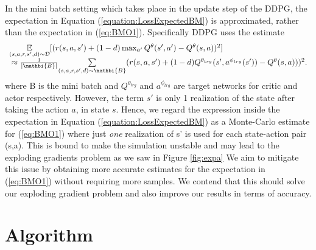 In the mini batch setting which takes place in the update step of the DDPG, the expectation in Equation (\ref{equation:LossExpectedBM}) is approximated, rather than the expectation in (\ref{eq:BMO1}). Specifically DDPG uses the estimate
\begin{equation}\label{equation:bellman}
\begin{array}{l@{}l}
    &{}\underset{(s,a,r,s',d) \sim {\mathcal{D}} }{\mathbb{E}}[(r(s,a,s') + (1-d) \max_{a'} Q^\theta(s',a') - Q^\theta(s,a))^2]\\  &{} \approx \frac{1}{|\mathbi{B}|}\underset{(s,a,r,s',d) \sim {\mathbi{B}}}{\sum}(r(s,a,s') + (1-d) Q^{\theta_{trg}}(s',a^{\phi_{trg}}(s')) - Q^\theta    (s,a)))^2.
    \end{array}
\end{equation}
    where B is the mini batch and $Q^{\theta_{trg}}$ and $a^{\phi_{trg}}$ are target networks for critic and actor respectively. However, the term $s'$ is only 1 realization of the state after taking the action $a$, in state $s$. Hence, we regard the expression inside the expectation in Equation (\ref{equation:LossExpectedBM}) as a Monte-Carlo estimate for (\ref{eq:BMO1}) where just \textit{one} realization of s' is used for each state-action pair (s,a). This is bound to make the simulation unstable and may lead to the exploding gradients problem as we saw in Figure \ref{fig:expa}
We aim to mitigate this issue by obtaining more accurate estimates for the expectation in (\ref{eq:BMO1}) without requiring more samples. We contend that this should solve our exploding gradient problem and also improve our results in terms of accuracy.

\section{Algorithm}

